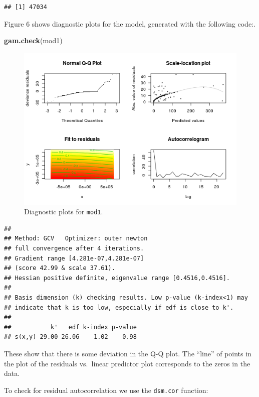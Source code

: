 \documentclass[]{article}
\newenvironment{Shaded}{}{}
\newcommand{\KeywordTok}[1]{\textcolor[rgb]{0.00,0.44,0.13}{\textbf{{#1}}}}
\newcommand{\NormalTok}[1]{{#1}}
\begin{document}
\begin{verbatim}
## [1] 47034
\end{verbatim}

Figure 6 shows diagnostic plots for the model, generated with the
following code:.

\begin{Shaded}
\begin{Highlighting}[]
\KeywordTok{gam.check}\NormalTok{(mod1)}
\end{Highlighting}
\end{Shaded}

\begin{figure}[htbp]
\centering
\includegraphics{mexico-figs/mod1-check.png}
\caption{Diagnostic plots for \texttt{mod1}.}
\end{figure}

\begin{verbatim}
## 
## Method: GCV   Optimizer: outer newton
## full convergence after 4 iterations.
## Gradient range [4.281e-07,4.281e-07]
## (score 42.99 & scale 37.61).
## Hessian positive definite, eigenvalue range [0.4516,0.4516].
## 
## Basis dimension (k) checking results. Low p-value (k-index<1) may
## indicate that k is too low, especially if edf is close to k'.
## 
##           k'   edf k-index p-value
## s(x,y) 29.00 26.06    1.02    0.98
\end{verbatim}

These show that there is some deviation in the Q-Q plot. The ``line'' of
points in the plot of the residuals vs.~linear predictor plot
corresponds to the zeros in the data.

To check for residual autocorrelation we use the \texttt{dsm.cor}
function:
\end{document}

